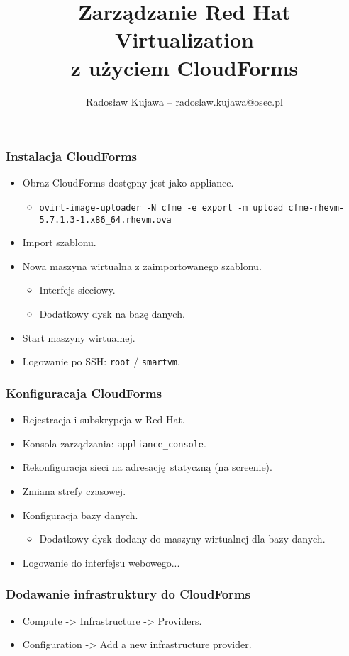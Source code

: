 \documentclass[dvipsnames,table]{beamer}
\title{Zarządzanie Red Hat Virtualization \\ z użyciem CloudForms}
\author{Radosław Kujawa -- radoslaw.kujawa@osec.pl}
\institute{OSEC}
\begin{document}
\begin{frame}
	\titlepage
\end{frame}

\begin{frame}
\frametitle{Instalacja CloudForms}
\begin{itemize}
	\item Obraz CloudForms dostępny jest jako appliance.
	\begin{itemize}
		\item {\tt ovirt-image-uploader -N cfme -e export -m upload cfme-rhevm-5.7.1.3-1.x86\_64.rhevm.ova}
	\end{itemize}
	\item Import szablonu.
	\item Nowa maszyna wirtualna z zaimportowanego szablonu.
	\begin{itemize}
		\item Interfejs sieciowy.
		\item Dodatkowy dysk na bazę danych.
	\end{itemize}
	\item Start maszyny wirtualnej.
	\item Logowanie po SSH: {\tt root} / {\tt smartvm}.
\end{itemize}
\end{frame}

\begin{frame}
\frametitle{Konfiguracaja CloudForms}
\begin{itemize}
	\item Rejestracja i subskrypcja w Red Hat.
	\item Konsola zarządzania: {\tt appliance\_console}.
	\item Rekonfiguracja sieci na adresację statyczną (na screenie).
	\item Zmiana strefy czasowej.
	\item Konfiguracja bazy danych.
	\begin{itemize}
		\item Dodatkowy dysk dodany do maszyny wirtualnej dla bazy danych.
	\end{itemize}
	\item Logowanie do interfejsu webowego...
\end{itemize}
\end{frame}

\begin{frame}
\frametitle{Dodawanie infrastruktury do CloudForms}
\begin{itemize}
	\item Compute -> Infrastructure -> Providers.
	\item Configuration -> Add a new infrastructure provider.
\end{itemize}
\end{frame}
\end{document}
